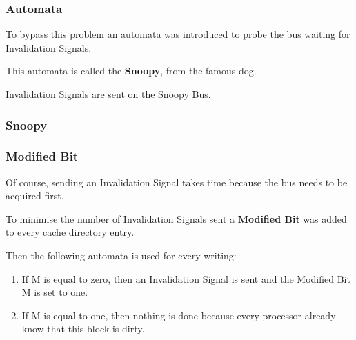 
\begin{frame}
  \frametitle{Automata}

  To bypass this problem an automata was introduced to probe the bus
  waiting for Invalidation Signals.

  \-

  This automata is called the \textbf{Snoopy}, from the famous dog.

  \-

  Invalidation Signals are sent on the Snoopy Bus.
\end{frame}


\begin{frame}
  \frametitle{Snoopy}

  \begin{center}
  \end{center}
\end{frame}


\begin{frame}
  \frametitle{Modified Bit}

  Of course, sending an Invalidation Signal takes time because the bus needs
  to be acquired first.

  \-

  To minimise the number of Invalidation Signals sent a \textbf{Modified Bit}
  was added to every cache directory entry.

  \-

  Then the following automata is used for every writing:

  \begin{enumerate}[<+->]
    \item
      If M is equal to zero, then an Invalidation Signal is sent and the
      Modified Bit M is set to one.
    \item
      If M is equal to one, then nothing is done because every processor
      already know that this block is dirty.
  \end{enumerate}
\end{frame}


